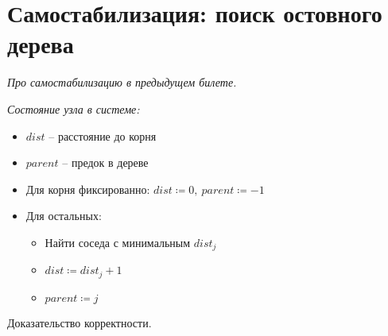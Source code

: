 \section{Самостабилизация: поиск остовного дерева}

\textit{Про самостабилизацию в предыдущем билете.}

\begin{definition} \textit{Состояние узла в системе:}
    \begin{itemize}
        \item $dist$ -- расстояние до корня
        \item $parent$ -- предок в дереве
    \end{itemize}
\end{definition}

\begin{algorithm}
    \enewline
    \begin{itemize}
        \item Для корня фиксированно: $dist \coloneqq 0,~ parent \coloneqq -1$
        \item Для остальных:
            \begin{itemize}
                \item Найти соседа с минимальным $dist_j$
                \item $dist \coloneqq dist_j + 1$
                \item $parent \coloneqq j$
            \end{itemize}
    \end{itemize}
\end{algorithm}

\begin{exercise}
    Доказательство корректности.
\end{exercise}